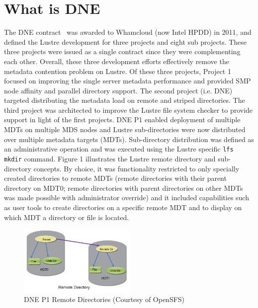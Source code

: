 \documentclass[conference,compsoc]{IEEEtran}
\begin{document}
\section{What is DNE}

The DNE contract~\cite{dne-contract} was awarded to Whamcloud (now Intel HPDD)
in 2011, and defined the Lustre development for three projects and eight
sub projects. These three projects were issued as a single contract since they
were complementing each other. Overall, these three development efforts
effectively remove the metadata contention problem on Lustre. Of these three
projects, Project 1 focused on improving the single server metadata performance
and provided SMP node affinity and parallel directory support. The second
project (i.e. DNE) targeted distributing the metadata load on remote and
striped directories. The third project was architected to improve the Lustre
file system checker to provide support in light of the first projects.  DNE P1
enabled deployment of multiple MDTs on multiple MDS nodes and Lustre
sub-directories were now distributed over multiple metadata targets (MDTs).
Sub-directory distribution was defined as an administrative operation and was
executed using the Lustre specific {\footnotesize{\texttt{lfs mkdir}}} command. Figure 1 illustrates the
Lustre remote directory and sub-directory concepts. By choice, it was
functionality restricted to only specially created directories to remote MDTs
(remote directories with their parent directory on MDT0; remote directories
with parent directories on other MDTs was made possible with administrator
override) and it included capabilities such as user tools to create directories
on a specific remote MDT and to display on which MDT a directory or file is
located. 


\begin{figure}[!ht]
  \centering
    \includegraphics[width=0.5\textwidth]{figs/dnep1}
  \caption{DNE P1 Remote Directories (Courtesy of OpenSFS)}
\end{figure}
 
\end{document}

